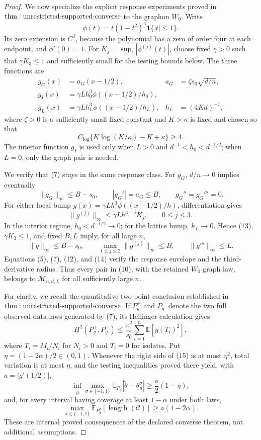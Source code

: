 \documentclass{article}
\begin{document}
\begin{proof}
We now specialize the explicit response experiments proved in \({\rm thm:unrestricted\text{-}supported\text{-}converse}\) to the graphon \(W_0\).  Write
\[
 \phi(t)=t(1-t^2)^4\mathbf1\{|t|\leq1\}.
\tag{9}
\]
Its zero extension is \(C^3\), because the polynomial has a zero of order four at each endpoint, and \(\phi'(0)=1\).  For \(K_j=\sup_t|\phi^{(j)}(t)|\), choose fixed \(\gamma>0\) such that \(\gamma K_3\leq1\) and sufficiently small for the testing bounds below.  The three functions are
\[
\begin{aligned}
 g_G(x)&=a_G(x-1/2),
 &a_G&=\zeta s_0\sqrt{d/n},\\
 g_I(x)&=\gamma Lh_0^3\phi((x-1/2)/h_0),&&\\
 g_L(x)&=\gamma Lh_L^3\phi((x-1/2)/h_L),
 &h_L&=(4Kd)^{-1},
\end{aligned}
\tag{10}
\]
where \(\zeta>0\) is a sufficiently small fixed constant and \(K>\kappa\) is fixed and chosen so that
\[
 C_{\log}\{K\log(K/\kappa)-K+\kappa\}\geq4.
\tag{11}
\]
The interior function \(g_I\) is used only when \(L>0\) and \(d^{-1}<h_0<d^{-1/2}\); when \(L=0\), only the graph pair is needed.

We verify that (7) stays in the same response class.  For \(g_G\), \(d/n\to0\) implies eventually
\[
 \|g_G\|_\infty\leq B-s_0,\qquad |g_G'|=a_G\leq B,\qquad
 g_G''=g_G'''=0.
\tag{12}
\]
For either local bump \(g(x)=\gamma Lh^3\phi((x-1/2)/h)\), differentiation gives
\[
 \|g^{(j)}\|_\infty\leq\gamma Lh^{3-j}K_j,\qquad 0\leq j\leq3.
\tag{13}
\]
In the interior regime, \(h_0<d^{-1/2}\to0\); for the lattice bump, \(h_L\to0\).  Hence (13), \(\gamma K_3\leq1\), and fixed \(B,L\) imply, for all large \(n\),
\[
 \|g\|_\infty\leq B-s_0,\qquad
 \max_{1\leq j\leq2}\|g^{(j)}\|_\infty\leq B,\qquad
 \|g'''\|_\infty\leq L.
\tag{14}
\]
Equations (5), (7), (12), and (14) verify the response envelope and the third-derivative radius.  Thus every pair in (10), with the retained \(W_0\) graph law, belongs to \(\mathcal M_{n,d,L}\) for all sufficiently large \(n\).

For clarity, we recall the quantitative two-point conclusion established in \({\rm thm:unrestricted\text{-}supported\text{-}converse}\).  If \(P_g^+\) and \(P_g^-\) denote the two full observed-data laws generated by (7), its Hellinger calculation gives
\[
 H^2(P_g^+,P_g^-)
 \leq\frac{\pi^2}{s_0^2}\sum_{i=1}^n\mathbb E[g(T_i)^2],
\tag{15}
\]
where \(T_i=M_i/N_i\) for \(N_i>0\) and \(T_i=0\) for isolates.  Put \(\eta=(1-2\alpha)/2\in(0,1)\).  Whenever the right side of (15) is at most \(\eta^2\), total variation is at most \(\eta\), and the testing inequalities proved there yield, with \(a=|g'(1/2)|\),
\[
 \inf_{\widetilde\theta}\max_{\sigma\in\{-1,1\}}
 \mathbb E_{P_g^\sigma}|\widetilde\theta-\theta_n^\sigma|
 \geq\frac a2(1-\eta),
\tag{16}
\]
and, for every interval having coverage at least \(1-\alpha\) under both laws,
\[
 \max_{\sigma\in\{-1,1\}}
 \mathbb E_{P_g^\sigma}[\operatorname{length}(\mathcal C)]
 \geq a(1-2\alpha).
\tag{17}
\]
These are internal proved consequences of the declared converse theorem, not additional assumptions.


\end{proof}
\end{document}
